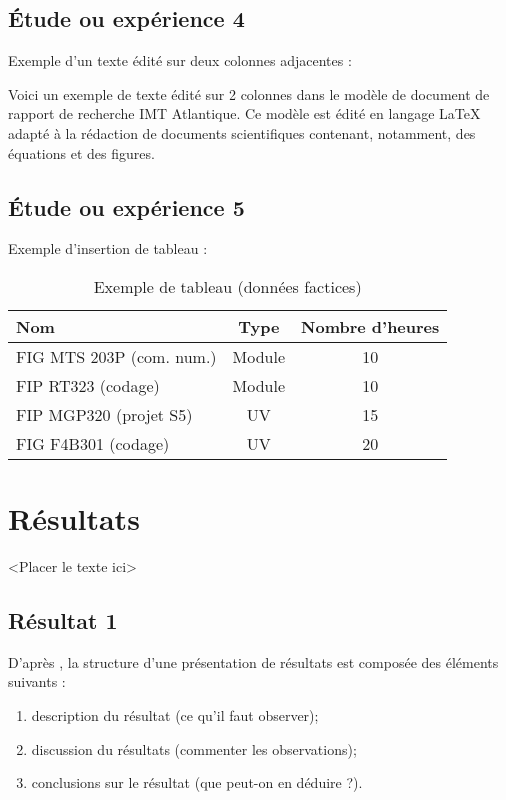 \documentclass[11pt,a4paper,french]{article}
\begin{document}
\subsection{Étude ou expérience 4}\label{sec:SS_EXP4}

Exemple d'un texte édité sur deux colonnes adjacentes :

\begin{multicols}{2}
	Voici un exemple de texte édité sur 2 colonnes dans le modèle de document de rapport de recherche IMT Atlantique. Ce modèle
	est édité en langage \LaTeX{} adapté à la rédaction de documents scientifiques contenant, notamment, des équations et des figures.
\end{multicols}

\subsection{Étude ou expérience 5}\label{sec:SS_EXP5}

Exemple d'insertion de tableau :

\begin{table}[htb]
	\centering
	\begin{tabular}{lcc}
		\toprule
		\textbf{Nom}             & \textbf{Type} & \textbf{Nombre d'heures} \\ \midrule
		FIG MTS 203P (com. num.) &    Module     &            10            \\
		FIP RT323 (codage)       &    Module     &            10            \\
		FIP MGP320 (projet S5)   &      UV       &            15            \\
		FIG F4B301 (codage)      &      UV       &            20            \\ \bottomrule
	\end{tabular}
	\caption{Exemple de tableau (données factices)} \label{tab:T_ENSEIGNEMENT}
\end{table}

\section{Résultats}\label{sec:S_RES}

<Placer le texte ici>

\subsection{Résultat 1}\label{sec:SS_RES_1}

D'après \cite{[Lichtfouse2012]}, la structure d'une présentation de résultats est composée des éléments
suivants :
\begin{enumerate}
	\item description du résultat (ce qu'il faut observer);
	\item discussion du résultats (commenter les observations);
	\item conclusions sur le résultat (que peut-on en déduire ?).
\end{enumerate}
\end{document}
